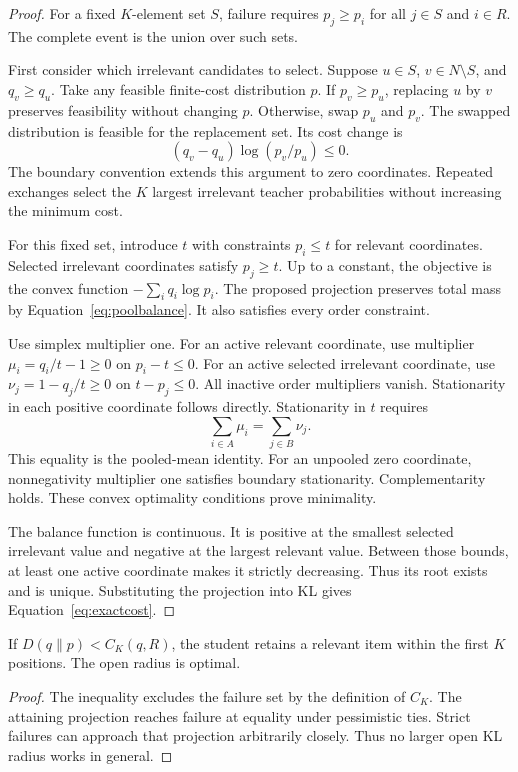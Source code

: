 \begin{proof}
For a fixed $K$-element set $S$, failure requires $p_j\geq p_i$ for all $j\in S$ and $i\in R$.
The complete event is the union over such sets.

First consider which irrelevant candidates to select.
Suppose $u\in S$, $v\in N\setminus S$, and $q_v\geq q_u$.
Take any feasible finite-cost distribution $p$.
If $p_v\geq p_u$, replacing $u$ by $v$ preserves feasibility without changing $p$.
Otherwise, swap $p_u$ and $p_v$.
The swapped distribution is feasible for the replacement set.
Its cost change is
\begin{equation}
(q_v-q_u)\log(p_v/p_u)\leq0.
\end{equation}
The boundary convention extends this argument to zero coordinates.
Repeated exchanges select the $K$ largest irrelevant teacher probabilities without increasing the minimum cost.

For this fixed set, introduce $t$ with constraints $p_i\leq t$ for relevant coordinates.
Selected irrelevant coordinates satisfy $p_j\geq t$.
Up to a constant, the objective is the convex function $-\sum_iq_i\log p_i$.
The proposed projection preserves total mass by Equation~\ref{eq:poolbalance}.
It also satisfies every order constraint.

Use simplex multiplier one.
For an active relevant coordinate, use multiplier $\mu_i=q_i/t-1\geq0$ on $p_i-t\leq0$.
For an active selected irrelevant coordinate, use $\nu_j=1-q_j/t\geq0$ on $t-p_j\leq0$.
All inactive order multipliers vanish.
Stationarity in each positive coordinate follows directly.
Stationarity in $t$ requires
\begin{equation}
\sum_{i\in A}\mu_i=\sum_{j\in B}\nu_j.
\end{equation}
This equality is the pooled-mean identity.
For an unpooled zero coordinate, nonnegativity multiplier one satisfies boundary stationarity.
Complementarity holds.
These convex optimality conditions prove minimality.

The balance function is continuous.
It is positive at the smallest selected irrelevant value and negative at the largest relevant value.
Between those bounds, at least one active coordinate makes it strictly decreasing.
Thus its root exists and is unique.
Substituting the projection into KL gives Equation~\ref{eq:exactcost}.
\end{proof}

\begin{corollary}
If $D(q\|p)<C_K(q,R)$, the student retains a relevant item within the first $K$ positions.
The open radius is optimal.
\end{corollary}
\begin{proof}
The inequality excludes the failure set by the definition of $C_K$.
The attaining projection reaches failure at equality under pessimistic ties.
Strict failures can approach that projection arbitrarily closely.
Thus no larger open KL radius works in general.
\end{proof}

